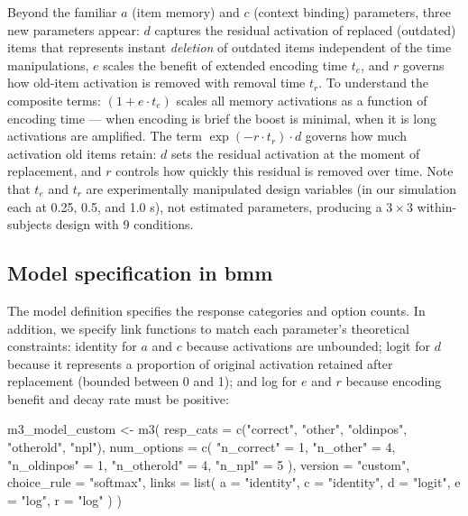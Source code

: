 \documentclass[
  man,
  floatsintext,
  longtable,
  nolmodern,
  notxfonts,
  notimes,
  colorlinks=true,linkcolor=blue,citecolor=blue,urlcolor=blue]{apa7}
\newenvironment{Shaded}{\begin{snugshade}}{\end{snugshade}}
\newcommand{\AttributeTok}[1]{\textcolor[rgb]{0.40,0.45,0.13}{#1}}
\newcommand{\DecValTok}[1]{\textcolor[rgb]{0.68,0.00,0.00}{#1}}
\newcommand{\FunctionTok}[1]{\textcolor[rgb]{0.28,0.35,0.67}{#1}}
\newcommand{\NormalTok}[1]{\textcolor[rgb]{0.00,0.23,0.31}{#1}}
\newcommand{\OtherTok}[1]{\textcolor[rgb]{0.00,0.23,0.31}{#1}}
\newcommand{\StringTok}[1]{\textcolor[rgb]{0.13,0.47,0.30}{#1}}
\begin{document}
Beyond the familiar \(a\) (item memory) and \(c\) (context binding)
parameters, three new parameters appear: \(d\) captures the residual
activation of replaced (outdated) items that represents instant
\emph{deletion} of outdated items independent of the time manipulations,
\(e\) scales the benefit of extended encoding time \(t_e\), and \(r\)
governs how old-item activation is removed with removal time \(t_r\). To
understand the composite terms: \((1 + e \cdot t_e)\) scales all memory
activations as a function of encoding time --- when encoding is brief
the boost is minimal, when it is long activations are amplified. The
term \(\exp(-r \cdot t_r) \cdot d\) governs how much activation old
items retain: \(d\) sets the residual activation at the moment of
replacement, and \(r\) controls how quickly this residual is removed
over time. Note that \(t_e\) and \(t_r\) are experimentally manipulated
design variables (in our simulation each at 0.25, 0.5, and 1.0 s), not
estimated parameters, producing a \(3 \times 3\) within-subjects design
with 9 conditions.

\subsection{Model specification in
bmm}\label{model-specification-in-bmm}

The model definition specifies the response categories and option
counts. In addition, we specify link functions to match each parameter's
theoretical constraints: identity for \(a\) and \(c\) because
activations are unbounded; logit for \(d\) because it represents a
proportion of original activation retained after replacement (bounded
between 0 and 1); and log for \(e\) and \(r\) because encoding benefit
and decay rate must be positive:

\begin{Shaded}
\begin{Highlighting}[]
\NormalTok{m3\_model\_custom }\OtherTok{\textless{}{-}} \FunctionTok{m3}\NormalTok{(}
  \AttributeTok{resp\_cats =} \FunctionTok{c}\NormalTok{(}\StringTok{"correct"}\NormalTok{, }\StringTok{"other"}\NormalTok{, }\StringTok{"oldinpos"}\NormalTok{, }\StringTok{"otherold"}\NormalTok{, }\StringTok{"npl"}\NormalTok{),}
  \AttributeTok{num\_options =} \FunctionTok{c}\NormalTok{(}
    \StringTok{"n\_correct"} \OtherTok{=} \DecValTok{1}\NormalTok{, }\StringTok{"n\_other"} \OtherTok{=} \DecValTok{4}\NormalTok{, }\StringTok{"n\_oldinpos"} \OtherTok{=} \DecValTok{1}\NormalTok{,}
    \StringTok{"n\_otherold"} \OtherTok{=} \DecValTok{4}\NormalTok{, }\StringTok{"n\_npl"} \OtherTok{=} \DecValTok{5}
\NormalTok{  ),}
  \AttributeTok{version     =} \StringTok{"custom"}\NormalTok{,}
  \AttributeTok{choice\_rule =} \StringTok{"softmax"}\NormalTok{,}
  \AttributeTok{links =} \FunctionTok{list}\NormalTok{(}
    \AttributeTok{a =} \StringTok{"identity"}\NormalTok{, }\AttributeTok{c =} \StringTok{"identity"}\NormalTok{,}
    \AttributeTok{d =} \StringTok{"logit"}\NormalTok{, }\AttributeTok{e =} \StringTok{"log"}\NormalTok{, }\AttributeTok{r =} \StringTok{"log"}
\NormalTok{  )}
\NormalTok{)}
\end{Highlighting}
\end{Shaded}
\end{document}
